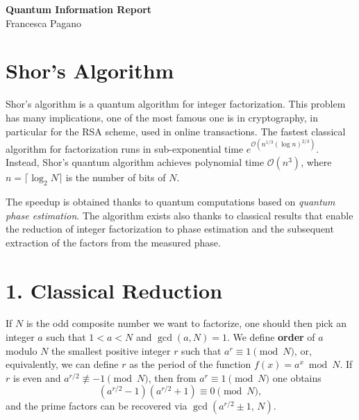 \documentclass[11pt,a4paper]{article}
\begin{document}

\begin{center}
    {\LARGE\bfseries Quantum Information Report}\\[0.3em]
    {\large Francesca Pagano}\\[0.3em]
\end{center}
\vspace{0.2em}

\section{Shor's Algorithm}

Shor's algorithm is a quantum algorithm for integer factorization. This problem has many implications, one of the most famous one is 
in cryptography, in particular for the RSA scheme, used in online transactions.
The fastest classical algorithm for factorization runs in sub-exponential time $e^{\mathcal{O}(n^{1/3}(\log n)^{2/3})}$.
 Instead, Shor's quantum algorithm achieves
polynomial time $\mathcal{O}(n^3)$, where $n = \lceil \log_2 N \rceil$ is the number of bits of $N$.

The speedup is obtained thanks to quantum computations based on \textit{quantum phase estimation}. 
The algorithm exists also thanks to classical results that enable the reduction of integer factorization to phase estimation and the subsequent extraction of the factors from the measured phase.

\section{1. Classical Reduction}

If $N$ is the odd composite number we want to factorize, one should then pick an integer $a$ such that $1 < a < N$ and
$\gcd(a,N)=1$. 
We define \textbf{order} of $a$ modulo $N$ the smallest positive integer $r$
such that $a^r \equiv 1 \pmod{N}$, or, equivalently, we can define $r$ as the period of the function
$f(x) = a^x \bmod N$. If $r$ is even and $a^{r/2} \not\equiv -1 \pmod{N}$, then from 
$a^r \equiv 1 \pmod{N}$ one obtains 
\begin{equation}
    \left(a^{r/2}-1\right)\!\left(a^{r/2}+1\right) \equiv 0 \pmod{N},
    \label{eq:factor}
\end{equation}
and the prime factors can be recovered via $\gcd(a^{r/2} \pm 1,\, N)$.
\end{document}
